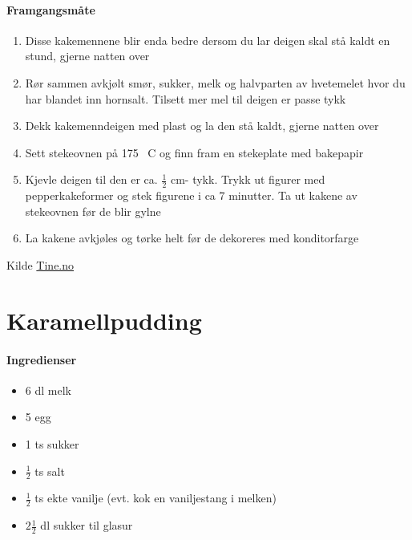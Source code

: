 \documentclass[12pt,a4paper]{book}
\begin{document}
\paragraph{Framgangsmåte}
\begin{enumerate}[noitemsep]
	\item Disse kakemennene blir enda bedre dersom du lar deigen skal stå kaldt en stund, gjerne natten over
	\item Rør sammen avkjølt smør, sukker, melk og halvparten av hvetemelet hvor du har blandet inn hornsalt. Tilsett mer mel til deigen er passe tykk
	\item Dekk kakemenndeigen med plast og la den stå kaldt, gjerne natten over
	\item Sett stekeovnen på 175 \degree~C og finn fram en stekeplate med bakepapir
	\item Kjevle deigen til den er ca. $\frac{1}{2}$ cm- tykk. Trykk ut figurer med pepperkakeformer og stek figurene i ca 7 minutter. Ta ut kakene av stekeovnen før de blir gylne
	\item La kakene avkjøles og tørke helt før de dekoreres med konditorfarge
\end{enumerate}


Kilde \href{http://www.tine.no/oppskrifter/kaker/vafler-og-smakaker/8721.cms?hvite-kakemenn-(og--damer)}{Tine.no}
\clearpage{}
\clearpage{}\section{Karamellpudding}

\paragraph{Ingredienser}
\begin{itemize}[noitemsep]
	\item 6 dl melk
	\item 5 egg
	\item 1 ts sukker
	\item $\frac{1}{2}$ ts salt
	\item $\frac{1}{2}$ ts ekte vanilje (evt. kok en vaniljestang i melken)
	\item $2 \frac{1}{2}$ dl sukker til glasur
\end{itemize}
\end{document}
